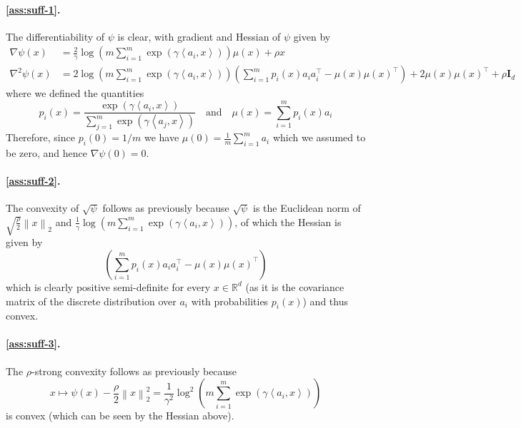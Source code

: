 \documentclass[a4paper]{article}
\newcommand{\pr}[1]{\left(#1\right)}
\newcommand{\norm}[1]{\left\|#1\right\|}
\newcommand{\inner}[2]{\left\langle #1,#2\right\rangle}
\newcommand{\I}[0]{\mathbf{I}}
\newcommand{\RR}[0]{\mathbb{R}}
\theoremstyle{thmstyle}
\theoremstyle{defstyle}
\theoremstyle{remark}
\begin{document}
    \paragraph{\ref{ass:suff-1}.} The differentiability of $\psi$ is clear, with gradient and Hessian of $\psi$ given by
    \begin{align*}
        \nabla\psi(x) &= \frac{2}{\gamma} \log\pr{ m\sum_{i=1}^m\exp(\gamma\inner{a_i}{x})} \mu(x) + \rho x \\
        \nabla^2\psi(x) &= 2\log\pr{m\sum_{i=1}^m\exp(\gamma\inner{a_i}{x})}\pr{\sum_{i=1}^m p_i(x)a_ia_i^\top-\mu(x)\mu(x)^\top} +2\mu(x)\mu(x)^\top+ \rho\I_d
    \end{align*}
    where we defined the quantities
    \begin{equation*}
        p_i(x) = \frac{\exp(\gamma\inner{a_i}{x})}{\sum_{j=1}^m \exp(\gamma\inner{a_j}{x})} \quad \text{and} \quad \mu(x) = \sum_{i=1}^m p_i(x) a_i
    \end{equation*}
    Therefore, since $p_i(0)=1/m$ we have $\mu(0)=\frac{1}{m}\sum_{i=1}^m a_i $ which we assumed to be zero, and hence $\nabla \psi(0)=0$.

    \paragraph{\ref{ass:suff-2}.} The convexity of $\sqrt{\psi}$ follows as previously because $\sqrt{\psi}$ is the Euclidean norm of $\sqrt{\frac{\rho}{2}}\norm{x}_2$ and $\frac{1}{\gamma}\log \pr{m\sum_{i=1}^m \exp\pr{\gamma \inner{a_i}{x}}}$, of which the Hessian 
    is given by
    \begin{equation*}
        \pr{\sum_{i=1}^m p_i(x)a_ia_i^\top-\mu(x)\mu(x)^\top}
    \end{equation*}
    which is clearly positive semi-definite for every $x\in\RR^d$ (as it is the covariance matrix of the discrete distribution over $a_i$ with probabilities $p_i(x)$) and thus convex.

    \paragraph{\ref{ass:suff-3}.} The $\rho$-strong convexity follows as previously because
    \begin{equation*}
        x\mapsto \psi(x) - \frac{\rho}{2}\norm{x}_2^2 = \frac{1}{\gamma^2}\log^2 \pr{m\sum_{i=1}^m \exp\pr{\gamma \inner{a_i}{x}}}
    \end{equation*}
    is convex (which can be seen by the Hessian above).
\end{document}
